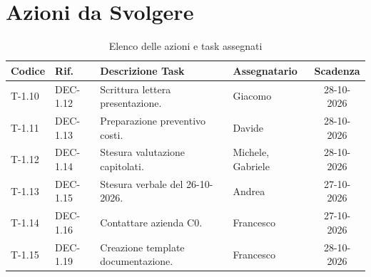 \documentclass[11pt, a4paper]{article}
\begin{document}
\section{Azioni da Svolgere}

\begin{table}[htbp]
\centering
\caption{Elenco delle azioni e task assegnati}
\label{tab:azioni}
\begin{tabularx}{\textwidth}{l l X l c}
\toprule
\textbf{Codice} & \textbf{Rif.} & \textbf{Descrizione Task} & \textbf{Assegnatario} & \textbf{Scadenza} \\
\midrule
T-1.10 & DEC-1.12 & Scrittura lettera presentazione. & Giacomo & 28-10-2026 \\
T-1.11 & DEC-1.13 & Preparazione preventivo costi. & Davide   & 28-10-2026 \\
T-1.12 & DEC-1.14 & Stesura valutazione capitolati. & Michele, Gabriele    & 28-10-2026 \\
T-1.13 & DEC-1.15 & Stesura verbale del 26-10-2026. & Andrea & 27-10-2026 \\
T-1.14 & DEC-1.16 & Contattare azienda C0. & Francesco & 27-10-2026 \\
T-1.15 & DEC-1.19 & Creazione template documentazione. & Francesco & 28-10-2026 \\
\bottomrule
\end{tabularx}
\end{table}
\end{document}
